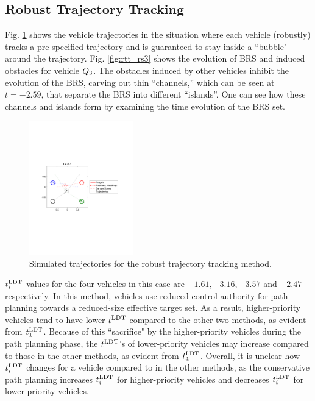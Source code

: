 \subsection{Robust Trajectory Tracking}
Fig. \ref{fig:rtt_traj} shows the vehicle trajectories in the situation where each vehicle (robustly) tracks a pre-specified trajectory and is guaranteed to stay inside a ``bubble" around the trajectory. Fig. \ref{fig:rtt_rs3} shows the evolution of BRS and induced obstacles for vehicle $Q_3$. The obstacles induced by other vehicles inhibit the evolution of the BRS, carving out thin “channels,” which can be seen at $t = -2.59$, that separate the BRS into different “islands”. One can see how these channels and islands form by examining the time evolution of the BRS set.

\begin{figure}
  \centering
  \includegraphics[width=0.40\textwidth]{"fig/rtt_traj"}
  \caption{Simulated trajectories for the robust trajectory tracking method.}
  \label{fig:rtt_traj}
  \vspace{-2em}
\end{figure}

$t^\text{LDT}_i$ values for the four vehicles in this case are $-1.61, -3.16, -3.57$ and $-2.47$ respectively. In this method, vehicles use reduced control authority for path planning towards a reduced-size effective target set. As a result, higher-priority vehicles tend to have lower $t^\text{LDT}$ compared to the other two methods, as evident from $t^\text{LDT}_1$. Because of this ``sacrifice" by the higher-priority vehicles during the path planning phase, the $t^\text{LDT}$'s of lower-priority vehicles may increase compared to those in the other methods, as evident from $t^\text{LDT}_4$. Overall, it is unclear how $t^\text{LDT}_i$ changes for a vehicle compared to in the other methods, as the conservative path planning increases $t^\text{LDT}_i$ for higher-priority vehicles and decreases $t^\text{LDT}_i$ for lower-priority vehicles.

